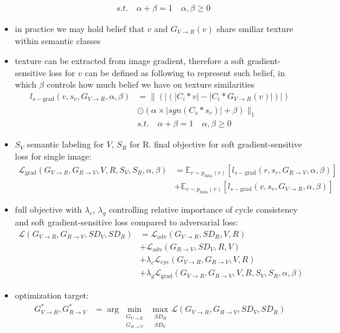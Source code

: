 \begin{itemize}
\begin{align}
	&s.t.\quad \alpha + \beta = 1 \quad \alpha, \beta \geq 0
	\end{align}
	\item in practice we may hold belief that $v$ and $G_{V\rightarrow R}(v)$ share smiliar texture within semantic classes
	\item texture can be extracted from image gradient, therefore a soft gradient-sensitive loss for $v$ can be defined as following to represent such belief, in which $\beta$ controls how much belief we have on texture similarities
	\begin{align}
	l_{s-\text{grad}}(v, s_v, G_{V\rightarrow R}, \alpha, \beta) &= \lVert(|(|C_i*v|-|C_i*G_{V\rightarrow R}(v)|)|)\\
	&\odot (\alpha \times |sgn(C_s*s_v)|+\beta)\rVert_1\\
	&s.t. \quad \alpha + \beta = 1 \quad \alpha, \beta \geq 0
	\end{align}
	\item $S_V$ semantic labeling for $V$, $S_R$ for R. final objective for soft gradient-sensitive loss for single image:
	\begin{align}
	\mathcal{L}_{\text{grad}}(G_{V\rightarrow R}, G_{R\rightarrow V}, V, R, S_V, S_R, \alpha, \beta) &= \mathbb{E}_{r\sim p_{\text{data}}(r)}[l_{s-\text{grad}}(r,s_r, G_{R\rightarrow V}, \alpha, \beta)]\\
	&+ \mathbb{E}_{v\sim p_{\text{data}}(v)}[l_{s-\text{grad}}(v,s_v, G_{V\rightarrow R}, \alpha, \beta)]
	\end{align}
	\item full objective with $\lambda_c$, $\lambda_g$ controlling relative importance of cycle consistency and soft gradient-sensitive loss compared to adversarial loss:
	\begin{align}
	\mathcal{L}(G_{V\rightarrow R}, G_{R\rightarrow V}, SD_V, SD_R) &= \mathcal{L}_{\text{adv}}(G_{V\rightarrow R}, SD_R, V, R)\\
	&+ \mathcal{L}_{\text{adv}}(G_{R\rightarrow V}, SD_V, R, V)\\
	&+ \lambda_c \mathcal{L}_{\text{cyc}}(G_{V\rightarrow R}, G_{R\rightarrow V}, V, R)\\
	&+ \lambda_g \mathcal{L}_{\text{grad}}(G_{V\rightarrow R}, G_{R\rightarrow V}, V, R, S_V, S_R, \alpha, \beta)
	\end{align}
	\item optimization target:
	\begin{align}
	G^*_{V\rightarrow R}, G^*_{R\rightarrow V} &= \arg \underset{\substack{G_{V\rightarrow R}\\ G_{R\rightarrow V}}}{\min}~ \underset{\substack{SD_R\\SD_V}}{\max}\mathcal{L}(G_{V\rightarrow R}, G_{R\rightarrow V}, SD_V, SD_R)
	\end{align}
\end{itemize}

